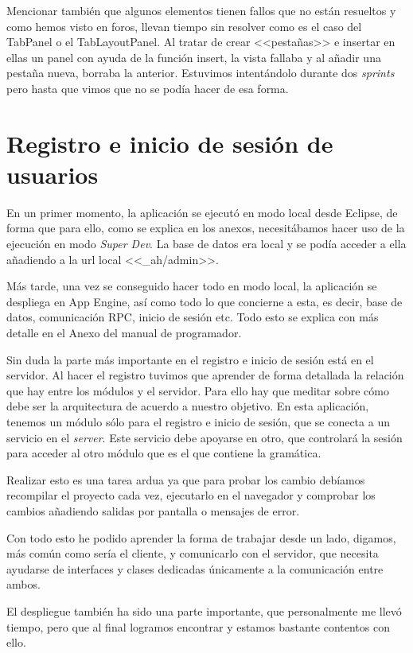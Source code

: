 Mencionar también que algunos elementos tienen fallos que no están resueltos y como hemos visto en foros, llevan tiempo sin resolver como es el caso del TabPanel o el TabLayoutPanel. Al tratar de crear <<pestañas>> e insertar en ellas un panel con ayuda de la función insert, la vista fallaba y al añadir una pestaña nueva, borraba la anterior. Estuvimos intentándolo durante dos \emph{sprints} pero hasta que vimos que no se podía hacer de esa forma.

\section{Registro e inicio de sesión de usuarios}

En un primer momento, la aplicación se ejecutó en modo local desde Eclipse, de forma que para ello, como se explica en los anexos, necesitábamos hacer uso de la ejecución en modo \emph{Super Dev}. La base de datos era local y se podía acceder a ella añadiendo a la url local <<\_ah/admin>>.

Más tarde, una vez se conseguido hacer todo en modo local, la aplicación se despliega en  App Engine, así como todo lo que concierne a esta, es decir, base de datos, comunicación RPC, inicio de sesión etc. Todo esto se explica con más detalle en el Anexo del manual de programador.

Sin duda la parte más importante en el registro e inicio de sesión está en el servidor. Al hacer el registro tuvimos que aprender de forma detallada la relación que hay entre los módulos y el servidor. Para ello hay que meditar sobre cómo debe ser la arquitectura de acuerdo a nuestro objetivo. En esta aplicación, tenemos un módulo sólo para el registro e inicio de sesión, que se conecta a un servicio en el \emph{server}. Este servicio debe apoyarse en otro, que controlará la sesión para acceder al otro módulo que es el que contiene la gramática.

Realizar esto es una tarea ardua ya que para probar los cambio debíamos recompilar el proyecto cada vez, ejecutarlo en el navegador y comprobar los cambios añadiendo salidas por pantalla o mensajes de error. 

Con todo esto he podido aprender la forma de trabajar desde un lado, digamos, más común como sería el cliente, y comunicarlo con el servidor, que necesita ayudarse de interfaces y clases dedicadas únicamente a la comunicación entre ambos. 

El despliegue también ha sido una parte importante, que personalmente me llevó tiempo, pero que al final logramos encontrar y estamos bastante contentos con ello. 
